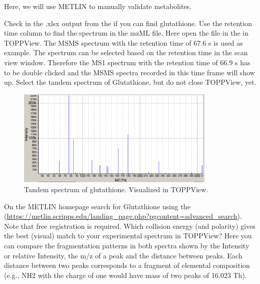 Here, we will use METLIN to manually validate metabolites.

\begin{task}
Check in the .xlsx output from the  if you can find glutathione. Use the retention time column to find the spectrum in the mzML file. Here open the file in the  in  TOPPView. The MSMS spectrum with the retention time of 67.6 s is used as example. The spectrum can be selected based on the retention time in the scan view window. Therefore the MS1 spectrum with the retention time of 66.9 s has to be double clicked and the MSMS spectra recorded in this time frame will show up. Select the tandem spectrum of Glutathione, but do not close TOPPView, yet.
\end{task} 

\begin{figure}[htbp]
  \centering
  \includegraphics[width=0.85\textwidth]{graphics/metabo/glutathioneTV.png}
  \caption{Tandem spectrum of glutathione. Visualized in TOPPView.}
  \label{fig:glutathioneTandemSpectrum}
\end{figure}

\begin{task}
On the METLIN homepage search for  Glutathione using the  (\url{https://metlin.scripps.edu/landing_page.php?pgcontent=advanced_search}). Note that free registration is required. Which collision energy (and polarity) gives the best (visual) match to your experimental spectrum in TOPPView? Here you can compare the fragmentation patterns in both spectra shown by the Intensity or relative Intensity, the m/z of a peak and the distance between peaks. Each distance between two peaks corresponds to a fragment of elemental composition (e.g., NH2 with the charge of one would have mass of two peaks of 16.023 Th).
\end{task}

